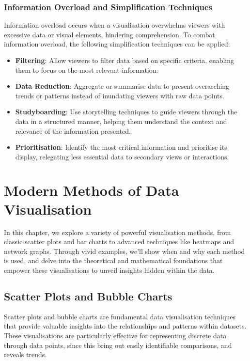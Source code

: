 \documentclass{article}\usepackage[]{graphicx}\usepackage[]{xcolor}
\begin{document}
\subsubsection{Information Overload and Simplification Techniques}
Information overload occurs when a visualisation overwhelms viewers with excessive data or visual elements, hindering comprehension. To combat information overload, the following simplification techniques can be applied:
\begin{itemize}
    \item \textbf{Filtering}: Allow viewers to filter data based on specific criteria, enabling them to focus on the most relevant information.
    \item \textbf{Data Reduction}:  Aggregate or summarise data to present overarching trends or patterns instead of inundating viewers with raw data points.
    \item \textbf{Studyboarding}: Use storytelling techniques to guide viewers through the data in a structured manner, helping them understand the context and relevance of the information presented.
    \item \textbf{Prioritisation}: Identify the most critical information and prioritise its display, relegating less essential data to secondary views or interactions.
\end{itemize}

\newpage

\section{Modern Methods of Data Visualisation}
In this chapter, we explore a variety of powerful visualisation methods, from classic scatter plots and bar charts to advanced techniques like heatmaps and network graphs. Through vivid examples, we'll show when and why each method is used, and delve into the theoretical and mathematical foundations that empower these visualisations to unveil insights hidden within the data.

\subsection{Scatter Plots and Bubble Charts}
Scatter plots and bubble charts are fundamental data visualisation techniques that provide valuable insights into the relationships and patterns within datasets. These visualisations are particularly effective for representing discrete data through data points, since this bring out easily identifiable comparisons, and reveals trends.
\end{document}
